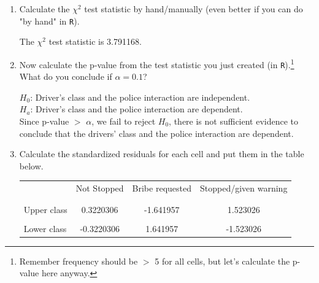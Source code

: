 \documentclass[12pt,letterpaper]{article}
\begin{document}
\begin{enumerate}
	
	\item [(a)]
	Calculate the $\chi^2$ test statistic by hand/manually (even better if you can do "by hand" in \texttt{R}).\\

	\begin{doublespace}
		
		The $\chi^2$ test statistic is 3.791168.
	\end{doublespace}
	\newpage
	\item [(b)]
	Now calculate the p-value from the test statistic you just created (in \texttt{R}).\footnote{Remember frequency should be $>$ 5 for all cells, but let's calculate the p-value here anyway.}  What do you conclude if $\alpha = 0.1$?\\
	\begin{doublespace}
		
		$H_0$: Driver's class and the police interaction are independent.\\
		$H_a$: Driver's class and the police interaction are dependent.\\
		Since p-value $>$ $\alpha$, we fail to reject $H_0$, there is not sufficient evidence to conclude that the drivers' class and the police interaction are dependent.
		
	\end{doublespace}
	
	\newpage
	\item [(c)] Calculate the standardized residuals for each cell and put them in the table below.
	\vspace{1cm}
	
	\begin{table}[h]
		\centering
		\begin{tabular}{l | c c c }
			& Not Stopped & Bribe requested & Stopped/given warning \\
			\\[-1.8ex] 
			\hline \\[-1.8ex]
			Upper class  & 0.3220306 & -1.641957 & 1.523026 \\
			\\
			Lower class & -0.3220306 & 1.641957  & -1.523026 \\
			\hline
		\end{tabular}
		
	\end{table}
	

\end{enumerate}
\end{document}

